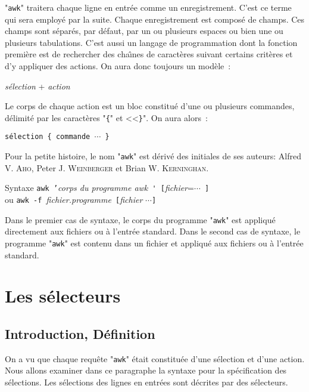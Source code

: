 "\texttt{awk}" traitera chaque ligne en entr{\'e}e comme un
enregistrement. C'est ce terme qui sera
employ{\'e} par la suite. Chaque enregistrement est compos{\'e} de champs. Ces
champs sont s{\'e}par{\'e}s, par d{\'e}faut, par un
ou plusieurs espaces ou bien une ou plusieurs tabulations. C'est aussi un langage
de programmation dont la fonction premi{\`e}re est de rechercher des cha{\^\i}nes
de caract{\`e}res suivant certains crit{\`e}res et d'y appliquer des actions. On
aura donc toujours un mod{\`e}le~: \centerline{\textsl{s{\'e}lection} +
\textsl{action}}

Le corps de chaque action est un bloc constitu{\'e} d'une ou plusieurs commandes,
d{\'e}limit{\'e} par les caract{\`e}res "\verb={=" et <<\verb=}=". On aura
alors~:
\begin{center}
{\tt s{\'e}lection \{ commande }$\cdots$\verb= }=
\end{center}

Pour la petite histoire, le nom "\texttt{awk}" est d{\'e}riv{\'e} des initiales de
ses auteurs: Alfred V. \textsc{Aho}, Peter J. \textsc{Weinberger} et Brian W.
\textsc{Kerninghan}.

\begin{definition}{Syntaxe}
\texttt{awk '}\textsl{corps du programme awk}\verb= ' [=\textsl{fichier}=$\cdots$\verb= ]=\\
ou
\texttt{awk -f }\textsl{fichier.programme}\verb= [=\textsl{fichier} $\cdots$\verb=]=
\end{definition}

Dans le premier cas de syntaxe, le corps du programme "\texttt{awk}"
est appliqu{\'e} directement aux fichiers ou {\`a} l'entr{\'e}e standard. Dans le
second cas de syntaxe, le programme "\texttt{awk}" est contenu dans un
fichier et appliqu{\'e} aux fichiers ou {\`a} l'entr{\'e}e standard.

\section{Les s{\'e}lecteurs}

\subsection{Introduction, D{\'e}finition}

On a vu que chaque requ{\^e}te "\texttt{awk}" {\'e}tait constitu{\'e}e d'une
s{\'e}lection et d'une action. Nous allons examiner dans ce paragraphe la
syntaxe pour la sp{\'e}cification des s{\'e}lections. Les s{\'e}lections des lignes
en entr{\'e}es sont d{\'e}crites par des s{\'e}lecteurs.

